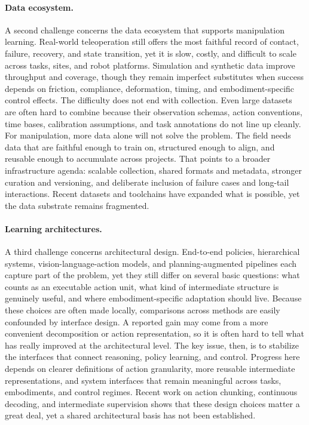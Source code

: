 \documentclass[acmsmall,screen,review,anonymous]{acmart}
\begin{document}
\paragraph{Data ecosystem.}\label{sec:challenge_data}
A second challenge concerns the data ecosystem that supports manipulation learning. Real-world teleoperation still offers the most faithful record of contact, failure, recovery, and state transition, yet it is slow, costly, and difficult to scale across tasks, sites, and robot platforms. Simulation and synthetic data improve throughput and coverage, though they remain imperfect substitutes when success depends on friction, compliance, deformation, timing, and embodiment-specific control effects. The difficulty does not end with collection. Even large datasets are often hard to combine because their observation schemas, action conventions, time bases, calibration assumptions, and task annotations do not line up cleanly. For manipulation, more data alone will not solve the problem. The field needs data that are faithful enough to train on, structured enough to align, and reusable enough to accumulate across projects. That points to a broader infrastructure agenda: scalable collection, shared formats and metadata, stronger curation and versioning, and deliberate inclusion of failure cases and long-tail interactions. Recent datasets and toolchains have expanded what is possible, yet the data substrate remains fragmented.
\paragraph{Learning architectures.}\label{sec:challenge_learning}
A third challenge concerns architectural design. End-to-end policies, hierarchical systems, vision-language-action models, and planning-augmented pipelines each capture part of the problem, yet they still differ on several basic questions: what counts as an executable action unit, what kind of intermediate structure is genuinely useful, and where embodiment-specific adaptation should live. Because these choices are often made locally, comparisons across methods are easily confounded by interface design. A reported gain may come from a more convenient decomposition or action representation, so it is often hard to tell what has really improved at the architectural level. The key issue, then, is to stabilize the interfaces that connect reasoning, policy learning, and control. Progress here depends on clearer definitions of action granularity, more reusable intermediate representations, and system interfaces that remain meaningful across tasks, embodiments, and control regimes. Recent work on action chunking, continuous decoding, and intermediate supervision shows that these design choices matter a great deal, yet a shared architectural basis has not been established.
\end{document}
